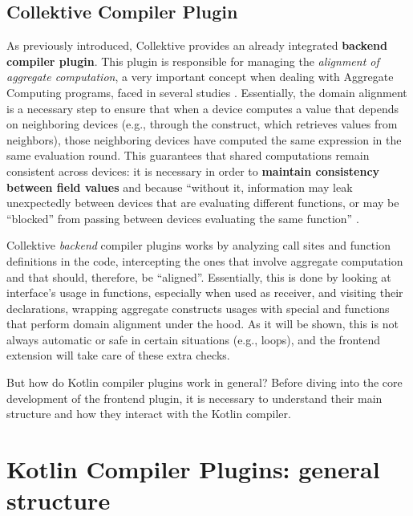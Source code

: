 \documentclass[12pt,a4paper,openright,twoside]{book}
\begin{document}
\subsection{Collektive Compiler Plugin}

As previously introduced, Collektive provides an already integrated
\textbf{backend compiler plugin}. This plugin is responsible for managing the
\emph{alignment of aggregate computation}, a very important concept when dealing
with Aggregate Computing programs, faced in several studies
\cite{DBLP:conf/forte/DamianiVPB15} \cite{DBLP:conf/saso/AudritoDVC16}.
%
Essentially, the domain alignment is a necessary step to ensure that when a
device computes a value that depends on neighboring devices (e.g., through the
 construct, which retrieves values from neighbors), those
neighboring devices have computed the same expression in the same evaluation
round. This guarantees that shared computations remain consistent across
devices: it is necessary in order to \textbf{maintain consistency between field
values} and  because ``without it, information
may leak unexpectedly between devices that are evaluating different functions,
or may be “blocked” from passing between devices evaluating the same function''
\cite{DBLP:conf/forte/DamianiVPB15}.

Collektive \emph{backend} compiler plugins works by analyzing call sites and
function definitions in the code, intercepting the ones that involve aggregate
computation and that should, therefore, be ``aligned''. Essentially, this is
done by looking at  interface's usage in functions,
especially when used as receiver, and visiting their declarations, wrapping
aggregate constructs usages with special  and
 functions that perform domain alignment under the hood.
%
As it will be shown, this is not always automatic or safe in certain situations
(e.g., loops), and the frontend extension will take care of these extra checks. 

But how do Kotlin compiler plugins work in general? Before diving into the 
core development of the frontend plugin, it is necessary to understand their
main structure and how they interact with the Kotlin compiler.

\section{Kotlin Compiler Plugins: general structure} 
\end{document}
